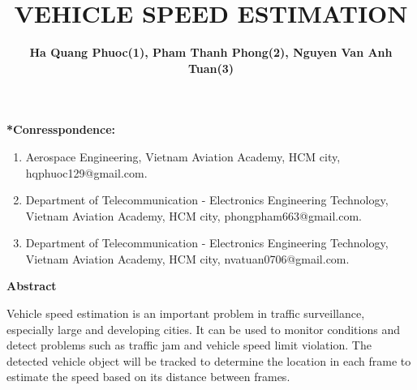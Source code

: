 \documentclass[12pt,a4paper]{article}
\begin{document}
    \title{\textbf{VEHICLE SPEED ESTIMATION}}
    \author{\textbf{Ha Quang Phuoc(1), Pham Thanh Phong(2), Nguyen Van Anh Tuan(3)}}
    \maketitle
    \textbf{*Conresspondence:}
    \begin{enumerate}
        \item Aerospace Engineering, Vietnam Aviation Academy, HCM city, hqphuoc129@gmail.com.
        \item Department of Telecommunication - Electronics Engineering Technology,
        Vietnam Aviation Academy, HCM city, phongpham663@gmail.com.
        \item Department of Telecommunication - Electronics Engineering Technology,
        Vietnam Aviation Academy, HCM city, nvatuan0706@gmail.com.
    \end{enumerate}
    \begin{center}
        \textbf{\huge{Abstract}}
    \end{center}
        Vehicle speed estimation is an important problem in traffic surveillance, 
        especially large and developing cities. It can be used to monitor conditions 
        and detect problems such as traffic jam and vehicle speed limit violation. 
        The detected vehicle object will be tracked to determine the location in each 
        frame to estimate the speed based on its distance between frames. 
\end{document}
